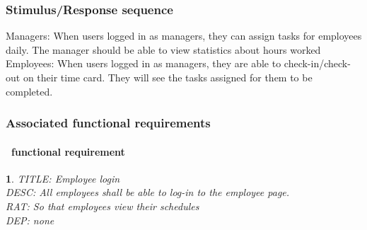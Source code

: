 \documentclass{scrreprt}
\theoremstyle{funreq}
\newtheorem{funreq}{}
\begin{document}
	
	\subsubsection{Stimulus/Response sequence}
	Managers:
	When users logged in as managers, they can assign tasks for employees daily.  The manager should be able to view statistics about hours worked
	Employees:
	When users logged in as managers, they are able to check-in/check-out on their time card. They will see the tasks assigned for them to be completed.
	
	\subsubsection{Associated functional requirements}
	\paragraph[]{\Subsectionname ~functional requirement }
	\begin{funreq}
		\label{employee_login}
		TITLE: Employee login\\
		DESC: All employees shall be able to log-in to the employee page.\\
		RAT: So that employees view their schedules\\
		DEP: none
	\end{funreq}
	
\end{document}
